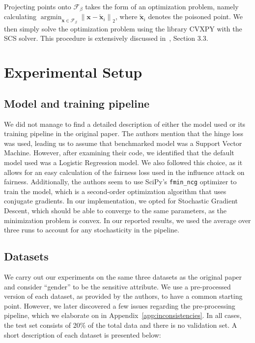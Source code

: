 Projecting points onto $\mathcal{F}_\beta$ takes the form of an optimization problem, namely calculating $ \operatorname{argmin}_{\mathbf{x} \in \mathcal{F}_{\beta}}\left\|\mathbf{x}-\tilde{\mathbf{x}}_{i}\right\|_{2}$, where $\tilde{\mathbf{x}}_i$ denotes the poisoned point. We then simply solve the optimization problem using the library CVXPY with the SCS solver. This procedure is extensively discussed in~\cite{koh2018}, Section 3.3.

\section{Experimental Setup}
\subsection{Model and training pipeline}
We did not manage to find a detailed description of either the model used or its training pipeline in the original paper. The authors mention that the hinge loss was used, leading us to assume that benchmarked model was a Support Vector Machine. However, after examining their code, we identified that the default model used was a Logistic Regression model. We also followed this choice, as it allows for an easy calculation of the fairness loss used in the influence attack on fairness. Additionally, the authors seem to use SciPy's \texttt{fmin\_ncg} optimizer to train the model, which is a second-order optimization algorithm that uses conjugate gradients. In our implementation, we opted for Stochastic Gradient Descent, which should be able to converge to the same parameters, as the minimization problem is convex. In our reported results, we used the average over three runs to account for any stochasticity in the pipeline.

\subsection{Datasets}
\label{sec:datasets}
We carry out our experiments on the same three datasets as the original paper and consider ``gender'' to be the sensitive attribute. We use a pre-processed version of each dataset, as provided by the authors, to have a common starting point. However, we later discovered a few issues regarding the pre-processing pipeline, which we elaborate on in Appendix~\ref{app:inconsistencies}. In all cases, the test set consists of 20\% of the total data and there is no validation set. A short description of each dataset is presented below:

